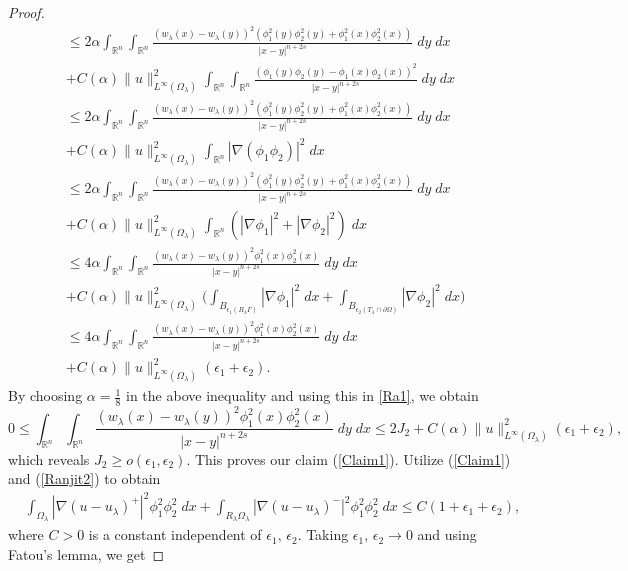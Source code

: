 \documentclass[11pt, notitlepage]{article}
\def\R{\mathbb{R}}
\begin{document}
{\begin{proof}
\begin{align*}
    &\leq 2\alpha \int_{\R^n}\int_{\R^n}\frac{(w_\lambda(x)-w_\lambda(y))^2(\phi_1^2(y)\phi_2^2(y)+\phi_1^2(x)\phi_2^2(x))}{|x-y|^{n+2s}}\;dy\;dx\nonumber\\
    &+C(\alpha)\|u\|^2_{L^\infty(\Omega_\lambda)}\int_{\R^n}\int_{\R^n}\frac{(\phi_1(y)\phi_2(y)-\phi_1(x)\phi_2(x))^2}{|x-y|^{n+2s}}\;dy\;dx\nonumber\\
    &\leq 2\alpha \int_{\R^n}\int_{\R^n}\frac{(w_\lambda(x)-w_\lambda(y))^2(\phi_1^2(y)\phi_2^2(y)+\phi_1^2(x)\phi_2^2(x))}{|x-y|^{n+2s}}\;dy\;dx\nonumber\\
    &+C(\alpha)\|u\|^2_{L^\infty(\Omega_\lambda)}\int_{\R^n} |\nabla(\phi_1\phi_2)|^2\;dx\nonumber\\
    &\leq 2\alpha \int_{\R^n}\int_{\R^n}\frac{(w_\lambda(x)-w_\lambda(y))^2(\phi_1^2(y)\phi_2^2(y)+\phi_1^2(x)\phi_2^2(x))}{|x-y|^{n+2s}}\;dy\;dx\nonumber\\
    &+C(\alpha)\|u\|^2_{L^\infty(\Omega_\lambda)}\int_{\R^n} (|\nabla \phi_1|^2+|\nabla\phi_2|^2)\;dx\nonumber\\
    &\leq 4\alpha \int_{\R^n}\int_{\R^n}\frac{(w_\lambda(x)-w_\lambda(y))^2\phi_1^2(x)\phi_2^2(x)}{|x-y|^{n+2s}}\;dy\;dx\nonumber\\
    &+C(\alpha)\|u\|^2_{L^\infty(\Omega_\lambda)}\big(\int_{B_{\epsilon_1(R_\lambda\Gamma)}} |\nabla\phi_1|^2\;dx+\int_{B_{\epsilon_2(T_\lambda\cap\partial\Omega)}} |\nabla\phi_2|^2\;dx\big)\nonumber\\
    &\leq 4\alpha \int_{\R^n}\int_{\R^n}\frac{(w_\lambda(x)-w_\lambda(y))^2\phi_1^2(x)\phi_2^2(x)}{|x-y|^{n+2s}}\;dy\;dx\nonumber\\
    &+C(\alpha)\|u\|^2_{L^\infty(\Omega_\lambda)}(\epsilon_1+\epsilon_2).
\end{align*}
By choosing $\alpha=\frac{1}{8}$ in the above inequality and using this in \eqref{Ra1}, we obtain $$0\leq\int_{\R^n}\int_{\R^n}\frac{(w_\lambda(x)-w_\lambda(y))^2\phi_1^2(x)\phi_2^2(x)}{|x-y|^{n+2s}}\;dy\;dx\leq 2J_2+C(\alpha)\|u\|^2_{L^\infty(\Omega_\lambda)}(\epsilon_1+\epsilon_2),$$
which reveals $J_2\geq o(\epsilon_1,\epsilon_2)$. This proves our claim (\ref{Claim1}).
Utilize (\ref{Claim1}) and (\ref{Ranjit2}) to obtain
\begin{align*}
    &\int_{\Omega_\lambda}|\nabla(u-u_\lambda)^+|^2\phi_1^2\phi_2^2\;dx+\int_{R_\lambda\Omega_\lambda}|\nabla(u-u_\lambda)^-|^2\phi_1^2\phi_2^2\;dx\leq C(1+\epsilon_1+\epsilon_2),
\end{align*}
where $C>0$ is a constant independent of $\epsilon_1,\,\epsilon_2$. Taking $\epsilon_1,\,\epsilon_2\to 0$ and using Fatou's lemma, we get

\end{proof}}
\end{document}
